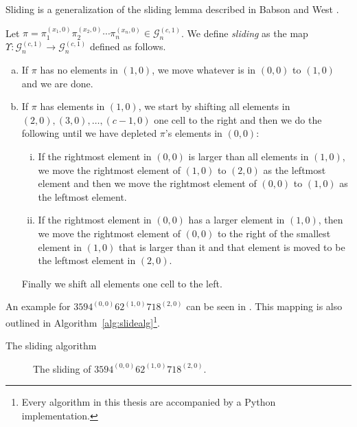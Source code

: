 Sliding is a generalization of the sliding lemma described in Babson and West \cite[Lemma 2.2]{slide}.

\begin{definition}
Let $\pi = \pi_1^{(x_1,0)}\pi_2^{(x_2,0)}\cdots\pi_n^{(x_n,0)} \in \mathcal{G}^{(c,1)}_n$. We define \emph{sliding} as the map $\Upsilon: \mathcal{G}^{(c,1)}_n \to \mathcal{G}^{(c,1)}_n$ defined as follows.
\begin{enumerate}[a)]
    \item If $\pi$ has no elements in $(1,0)$, we move whatever is in $(0,0)$ to $(1,0)$ and we are done.
    \item If $\pi$ has elements in $(1,0)$, we start by shifting all elements in $(2,0), (3,0), \dotsc, (c-1,0)$ one cell to the right and then we do the following until we have depleted $\pi$'s elements in $(0,0)$:
    \begin{enumerate}[i.]
        \item If the rightmost element in $(0,0)$ is larger than all elements in $(1,0)$, we move the rightmost element of $(1,0)$ to $(2,0)$ as the leftmost element and then we move the rightmost element of $(0,0)$ to $(1,0)$ as the leftmost element.
        \item If the rightmost element in $(0,0)$ has a larger element in $(1,0)$, then we move the rightmost element of $(0,0)$ to the right of the smallest element in $(1,0)$ that is larger than it and that element is moved to be the leftmost element in $(2,0)$.
    \end{enumerate}
    Finally we shift all elements one cell to the left.
\end{enumerate}
\end{definition}

An example for $3594^{(0,0)}62^{(1,0)}718^{(2,0)}$ can be seen in . This mapping is also outlined in Algorithm~\ref{alg:slidealg}\footnote{Every algorithm in this thesis are accompanied by a Python implementation.}.

\begin{algorithm}

\caption{The sliding algorithm}
\label{alg:slidealg}
\end{algorithm}

\begin{figure}[ht!]
    \centering
    
    \caption{The sliding of $3594^{(0,0)}62^{(1,0)}718^{(2,0)}$.}
    \label{fig:slide_gp_example}
\end{figure}

